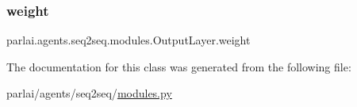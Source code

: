 \subsubsection{\texorpdfstring{weight}{weight}}
{\footnotesize\ttfamily parlai.\+agents.\+seq2seq.\+modules.\+Output\+Layer.\+weight}



The documentation for this class was generated from the following file\+:\begin{DoxyCompactItemize}
\item 
parlai/agents/seq2seq/\hyperlink{parlai_2agents_2seq2seq_2modules_8py}{modules.\+py}\end{DoxyCompactItemize}
